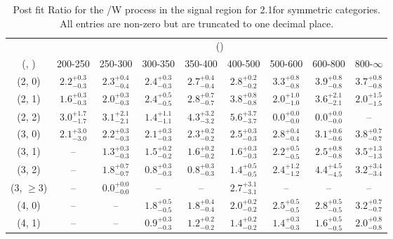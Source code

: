 \begin{table}[h!]
\tiny
\centering
\caption{Post fit Ratio for the \ttbar/W process in the signal region for 2.1\ifb for symmetric categories. All entries are non-zero but are truncated to one decimal place.\label{tab:ratioseppost_sig_ttw_sym}}
\begin{tabular}
{ccccccccc}
	\hline\hline
	& \multicolumn{8}{c}{\scalht (\gev)} \\ 
	 (\njet,  \nb) & 200-250 & 250-300 & 300-350 & 350-400 & 400-500 & 500-600 & 600-800 & 800-$\infty$ \\ [0.8ex] 
\hline
	(2, 0) & $2.2^{+ 0.3 }_{- 0.3 }$ & $2.3^{+ 0.4 }_{- 0.4 }$ & $2.4^{+ 0.3 }_{- 0.3 }$ & $2.7^{+ 0.4 }_{- 0.4 }$ & $2.8^{+ 0.2 }_{- 0.2 }$ & $3.3^{+ 0.8 }_{- 0.8 }$ & $3.9^{+ 0.8 }_{- 0.8 }$ & $3.7^{+ 0.8 }_{- 0.8 }$ \\[0.5ex] 
	(2, 1) & $1.6^{+ 0.3 }_{- 0.3 }$ & $2.0^{+ 0.3 }_{- 0.3 }$ & $2.4^{+ 0.5 }_{- 0.5 }$ & $2.8^{+ 0.7 }_{- 0.7 }$ & $3.8^{+ 0.8 }_{- 0.8 }$ & $2.0^{+ 1.0 }_{- 1.0 }$ & $3.6^{+ 2.1 }_{- 2.1 }$ & $2.0^{+ 1.5 }_{- 1.5 }$ \\[0.5ex] 
	(2, 2) & $3.0^{+ 1.7 }_{- 1.7 }$ & $3.1^{+ 2.1 }_{- 2.1 }$ & $1.4^{+ 1.1 }_{- 1.1 }$ & $4.3^{+ 3.2 }_{- 3.2 }$ & $5.6^{+ 3.7 }_{- 3.7 }$ & $0.0^{+ 0.0 }_{- 0.0 }$ & $0.0^{+ 0.0 }_{- 0.0 }$ & -- \\[0.5ex] 
	(3, 0) & $2.1^{+ 3.0 }_{- 3.0 }$ & $2.2^{+ 0.3 }_{- 0.3 }$ & $2.1^{+ 0.3 }_{- 0.3 }$ & $2.3^{+ 0.2 }_{- 0.2 }$ & $2.5^{+ 0.3 }_{- 0.3 }$ & $2.8^{+ 0.4 }_{- 0.4 }$ & $3.1^{+ 0.6 }_{- 0.6 }$ & $3.8^{+ 0.7 }_{- 0.7 }$ \\[0.5ex] 
	(3, 1) & -- & $1.3^{+ 0.3 }_{- 0.3 }$ & $1.5^{+ 0.2 }_{- 0.2 }$ & $1.6^{+ 0.2 }_{- 0.2 }$ & $1.6^{+ 0.3 }_{- 0.3 }$ & $2.2^{+ 0.5 }_{- 0.5 }$ & $2.5^{+ 0.8 }_{- 0.8 }$ & $3.5^{+ 1.3 }_{- 1.3 }$ \\[0.5ex] 
	(3, 2) & -- & $1.8^{+ 0.7 }_{- 0.7 }$ & $0.8^{+ 0.3 }_{- 0.3 }$ & $0.8^{+ 0.3 }_{- 0.3 }$ & $1.4^{+ 0.5 }_{- 0.5 }$ & $2.4^{+ 1.2 }_{- 1.2 }$ & $4.4^{+ 4.5 }_{- 4.5 }$ & $3.2^{+ 3.4 }_{- 3.4 }$ \\[0.5ex] 
	(3, $\ge3$) & -- & $0.0^{+ 0.0 }_{- 0.0 }$ & -- & -- & $2.7^{+ 3.1 }_{- 3.1 }$ & -- & -- & -- \\[0.5ex] 
	(4, 0) & -- & -- & $1.8^{+ 0.5 }_{- 0.5 }$ & $1.8^{+ 0.4 }_{- 0.4 }$ & $2.0^{+ 0.2 }_{- 0.2 }$ & $2.5^{+ 0.5 }_{- 0.5 }$ & $2.8^{+ 0.5 }_{- 0.5 }$ & $3.2^{+ 0.7 }_{- 0.7 }$ \\[0.5ex] 
	(4, 1) & -- & -- & $0.9^{+ 0.3 }_{- 0.3 }$ & $1.2^{+ 0.2 }_{- 0.2 }$ & $1.4^{+ 0.2 }_{- 0.2 }$ & $1.4^{+ 0.3 }_{- 0.3 }$ & $1.6^{+ 0.5 }_{- 0.5 }$ & $2.0^{+ 0.8 }_{- 0.8 }$ \\[0.5ex] 

\end{tabular}
\end{table}
